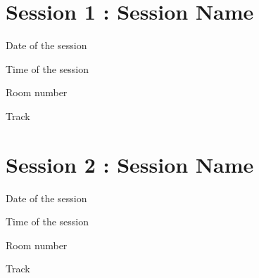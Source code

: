 \section{Session 1 : Session Name}
\begin{description}[labelindent=3pt,itemindent=-1pt,leftmargin=6pt]
    \item[Date:] Date of the session
    \item[Time:] Time of the session
    \item[Room:] Room number
    \item[Track:] Track
\end{description}

\section{Session 2 : Session Name}
\begin{description}[labelindent=3pt,itemindent=-1pt,leftmargin=6pt]
    \item[Date:] Date of the session
    \item[Time:] Time of the session
    \item[Room:] Room number
    \item[Track:] Track
\end{description}
